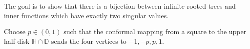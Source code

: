 The goal is to show that there is a bijection between infinite rooted trees and inner functions which have exactly two singular values.

Choose $p \in (0,1)$ such that the conformal mapping from a square to the upper half-disk $\mathbb H \cap \mathbb D$ sends the four vertices to $-1,-p,p,1$.

